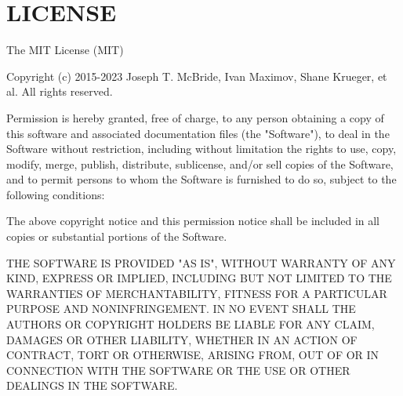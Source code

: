 \chapter{LICENSE}
\hypertarget{md__d_1_2_facultate_2an3_2_i_p_2_proiect_i_p_2_proiect___i_p_2packages_2_graph_q_l_87_88_80_2_l_i_c_e_n_s_e}{}\label{md__d_1_2_facultate_2an3_2_i_p_2_proiect_i_p_2_proiect___i_p_2packages_2_graph_q_l_87_88_80_2_l_i_c_e_n_s_e}
The MIT License (MIT)

Copyright (c) 2015-\/2023 Joseph T. Mc\+Bride, Ivan Maximov, Shane Krueger, et al. All rights reserved.

Permission is hereby granted, free of charge, to any person obtaining a copy of this software and associated documentation files (the "{}\+Software"{}), to deal in the Software without restriction, including without limitation the rights to use, copy, modify, merge, publish, distribute, sublicense, and/or sell copies of the Software, and to permit persons to whom the Software is furnished to do so, subject to the following conditions\+:

The above copyright notice and this permission notice shall be included in all copies or substantial portions of the Software.

THE SOFTWARE IS PROVIDED "{}\+AS IS"{}, WITHOUT WARRANTY OF ANY KIND, EXPRESS OR IMPLIED, INCLUDING BUT NOT LIMITED TO THE WARRANTIES OF MERCHANTABILITY, FITNESS FOR A PARTICULAR PURPOSE AND NONINFRINGEMENT. IN NO EVENT SHALL THE AUTHORS OR COPYRIGHT HOLDERS BE LIABLE FOR ANY CLAIM, DAMAGES OR OTHER LIABILITY, WHETHER IN AN ACTION OF CONTRACT, TORT OR OTHERWISE, ARISING FROM, OUT OF OR IN CONNECTION WITH THE SOFTWARE OR THE USE OR OTHER DEALINGS IN THE SOFTWARE. 
